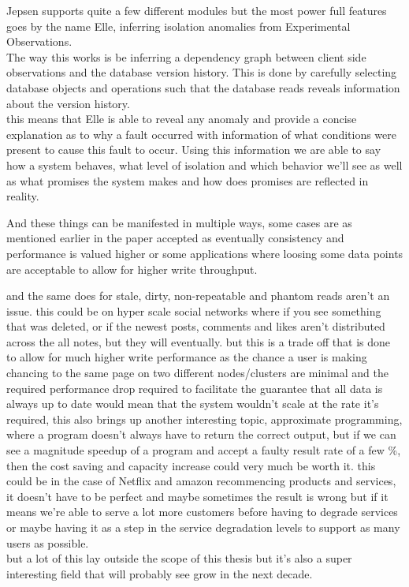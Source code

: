 \documentclass[a4paper,10pt,titlepage]{report}
\begin{document}
Jepsen supports quite a few different modules but the most power full features goes by the name Elle, inferring isolation anomalies from Experimental Observations. \\
\vspace{5mm}
The way this works is be inferring a dependency graph between client side observations and the database version history. This is done by carefully selecting database objects and operations such that the database reads reveals information about the version history.\\
\vspace{5mm}
this means that Elle is able to reveal any anomaly and provide a concise explanation as to why a fault occurred with information of what conditions were present to cause this fault to occur. Using this information we are able to say how a system behaves, what level of isolation and which behavior we'll see as well as what promises the system makes and how does promises are reflected in reality.\\
\vspace{5mm}

And these things can be manifested in multiple ways, some cases are as mentioned earlier in the paper accepted as eventually consistency and performance is valued higher or some applications where loosing some data points are acceptable to allow for higher write throughput.\\
\vspace{5mm}

and the same does for stale, dirty, non-repeatable and phantom reads aren't an issue. this could be on hyper scale social networks where if you see something that was deleted, or if the newest posts, comments and likes aren't distributed across the all notes, but they will eventually. but this is a trade off that is done to allow for much higher write performance as the chance a user is making chancing to the same page on two different nodes/clusters are minimal and the required performance drop required to facilitate the guarantee that all data is always up to date would mean that the system wouldn't scale at the rate it's required, this also brings up another interesting topic, approximate programming, where a program doesn't always have to return the correct output, but if we can see a magnitude speedup of a program and accept a faulty result rate of a few \%, then the cost saving and capacity increase could very much be worth it. this could be in the case of Netflix and amazon recommencing products and services, it doesn't have to be perfect and maybe sometimes the result is wrong but if it means we're able to serve a lot more customers before having to degrade services or maybe having it as a step in the service degradation levels to support as many users as possible. \\
\vspace{5mm}
but a lot of this lay outside the scope of this thesis but it's also a super interesting field that will probably see grow in the next decade.
\end{document}
